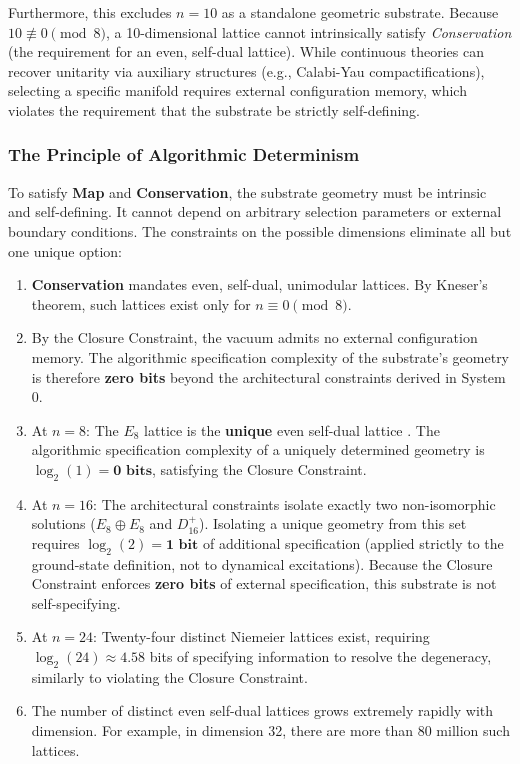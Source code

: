 Furthermore, this excludes $n = 10$ as a standalone geometric substrate. Because $10 \not\equiv 0 \pmod 8$, a 10-dimensional lattice cannot intrinsically satisfy \textit{Conservation} (the requirement for an even, self-dual lattice). While continuous theories can recover unitarity via auxiliary structures (e.g., Calabi-Yau compactifications), selecting a specific manifold requires external configuration memory, which violates the requirement that the substrate be strictly self-defining.

\subsubsection{The Principle of Algorithmic Determinism}
\label{sec:principleofalgorithmicdeterminism}

To satisfy \textbf{Map} and \textbf{Conservation}, the substrate geometry must be intrinsic and self-defining. It cannot depend on arbitrary selection parameters or external boundary conditions. The constraints on the possible dimensions eliminate all but one unique option:

\begin{enumerate}
    \item \textbf{Conservation} mandates even, self-dual, unimodular lattices. By Kneser's theorem, such lattices exist only for $n \equiv 0 \pmod{8}$.
    
    \item By the Closure Constraint, the vacuum admits no external configuration memory. The algorithmic specification complexity of the substrate's geometry is therefore \textbf{zero bits} beyond the architectural constraints derived in System 0.

    \item At $n = 8$: The $E_8$ lattice is the \textbf{unique} even self-dual lattice \cite{conway_sphere_1988}. The algorithmic specification complexity of a uniquely determined geometry is $\log_2(1) = \textbf{0 bits}$, satisfying the Closure Constraint.

    \item At $n = 16$: The architectural constraints isolate exactly two non-isomorphic solutions ($E_8 \oplus E_8$ and $D_{16}^+$). Isolating a unique geometry from this set requires $\log_2(2) = \textbf{1 bit}$ of additional specification (applied strictly to the ground-state definition, not to dynamical excitations). Because the Closure Constraint enforces \textbf{zero bits} of external specification, this substrate is not self-specifying.

    \item At $n = 24$: Twenty-four distinct Niemeier lattices exist, requiring $\log_2(24) \approx 4.58$ bits of specifying information to resolve the degeneracy, similarly to violating the Closure Constraint. 
    
    \item The number of distinct even self-dual lattices grows extremely rapidly with dimension. For example, in dimension 32, there are more than 80 million such lattices.
\end{enumerate}

